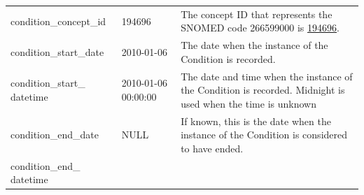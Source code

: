 \documentclass[11pt]{book}
\begin{document}
\begin{longtable}[]{@{}lll@{}}
\begin{minipage}[t]{0.28\columnwidth}
condition\_concept\_id\strut
\end{minipage} & \begin{minipage}[t]{0.16\columnwidth}\raggedright\strut
194696\strut
\end{minipage} & \begin{minipage}[t]{0.48\columnwidth}\raggedright\strut
The concept ID that represents the SNOMED code 266599000 is
\href{http://athena.ohdsi.org/search-terms/terms/194696}{194696}.\strut
\end{minipage}\tabularnewline
\begin{minipage}[t]{0.28\columnwidth}\raggedright\strut
condition\_start\_date\strut
\end{minipage} & \begin{minipage}[t]{0.16\columnwidth}\raggedright\strut
2010-01-06\strut
\end{minipage} & \begin{minipage}[t]{0.48\columnwidth}\raggedright\strut
The date when the instance of the Condition is recorded.\strut
\end{minipage}\tabularnewline
\begin{minipage}[t]{0.28\columnwidth}\raggedright\strut
condition\_start\_ datetime\strut
\end{minipage} & \begin{minipage}[t]{0.16\columnwidth}\raggedright\strut
2010-01-06 00:00:00\strut
\end{minipage} & \begin{minipage}[t]{0.48\columnwidth}\raggedright\strut
The date and time when the instance of the Condition is recorded.
Midnight is used when the time is unknown\strut
\end{minipage}\tabularnewline
\begin{minipage}[t]{0.28\columnwidth}\raggedright\strut
condition\_end\_date\strut
\end{minipage} & \begin{minipage}[t]{0.16\columnwidth}\raggedright\strut
NULL\strut
\end{minipage} & \begin{minipage}[t]{0.48\columnwidth}\raggedright\strut
If known, this is the date when the instance of the Condition is
considered to have ended.\strut
\end{minipage}\tabularnewline
\begin{minipage}[t]{0.28\columnwidth}\raggedright\strut
condition\_end\_ datetime\strut
\end{minipage} & \begin{minipage}[t]{0.16\columnwidth}\raggedright\strut

\end{minipage}
\end{longtable}
\end{document}
